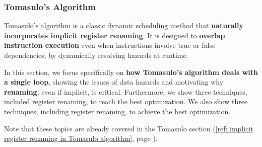 \subsubsection{Tomasulo's Algorithm}

Tomasulo's algorithm is a classic dynamic scheduling method that \textbf{naturally incorporates implicit register renaming}. It is designed to \textbf{overlap instruction execution} even when instructions involve true or false dependencies, by dynamically resolving hazards at runtime.

\highspace
In this section, we focus specifically on \textbf{how Tomasulo's algorithm deals with a single loop}, showing the issues of data hazards and motivating why \textbf{renaming}, even if implicit, is critical. Furthermore, we show three techniques, included register renaming, to reach the best optimization. We also show three techniques, including register renaming, to achieve the best optimization.

\highspace
Note that these topics are already covered in the Tomasulo section (\ref{ref: implicit register renaming in Tomasulo algorithm}, page ).

